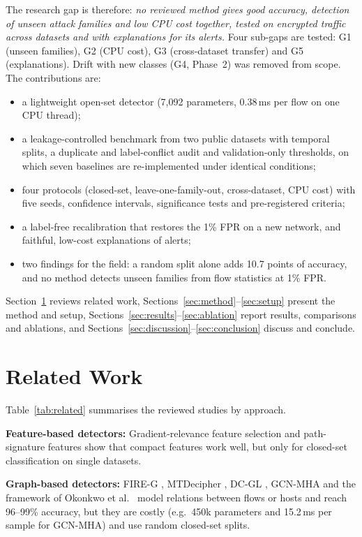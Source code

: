 \documentclass[pdflatex,sn-mathphys-num,iicol]{sn-jnl}%
\newcommand{\ms}{\,ms}
\begin{document}
The research gap is therefore: \emph{no reviewed method gives good accuracy, detection of unseen attack families and low CPU cost together, tested on encrypted traffic across datasets and with explanations for its alerts.} Four sub-gaps are tested: G1 (unseen families), G2 (CPU cost), G3 (cross-dataset transfer) and G5 (explanations). Drift with new classes (G4, Phase~2) was removed from scope. The contributions are:
\begin{itemize}
\item a lightweight open-set detector (7,092 parameters, 0.38\ms{} per flow on one CPU thread);
\item a leakage-controlled benchmark from two public datasets with temporal splits, a duplicate and label-conflict audit and validation-only thresholds, on which seven baselines are re-implemented under identical conditions;
\item four protocols (closed-set, leave-one-family-out, cross-dataset, CPU cost) with five seeds, confidence intervals, significance tests and pre-registered criteria;
\item a label-free recalibration that restores the 1\% FPR on a new network, and faithful, low-cost explanations of alerts;
\item two findings for the field: a random split alone adds 10.7 points of accuracy, and no method detects unseen families from flow statistics at 1\% FPR.
\end{itemize}
Section~\ref{sec:related} reviews related work, Sections~\ref{sec:method}--\ref{sec:setup} present the method and setup, Sections~\ref{sec:results}--\ref{sec:ablation} report results, comparisons and ablations, and Sections~\ref{sec:discussion}--\ref{sec:conclusion} discuss and conclude.

\section{Related Work}\label{sec:related}

Table~\ref{tab:related} summarises the reviewed studies by approach.

\textbf{Feature-based detectors:} Gradient-relevance feature selection \cite{lee2026afs} and path-signature features \cite{xu2025pathsig} show that compact features work well, but only for closed-set classification on single datasets.

\textbf{Graph-based detectors:} FIRE-G \cite{liu2026fireg}, MTDecipher \cite{li2026mtdecipher}, DC-GL \cite{yuan2025dcgl}, GCN-MHA \cite{liu2025gcnmha} and the framework of Okonkwo et al.\ \cite{okonkwo2025graph} model relations between flows or hosts and reach 96--99\% accuracy, but they are costly (e.g.\ 450k parameters and 15.2\ms{} per sample for GCN-MHA) and use random closed-set splits.
\end{document}
